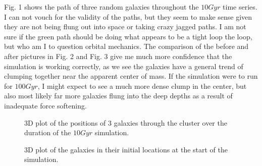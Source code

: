 \documentclass[twocolumn,11pt]{article}
\begin{document}
Fig. 1 shows the path of three random galaxies throughout the $10Gyr$ time series. I can not vouch for the validity of the paths, but they seem to make sense given they are not being flung out into space or taking crazy jagged paths. I am not sure if the green path should be doing what appears to be a tight loop the loop, but who am I to question orbital mechanics. The comparison of the before and after pictures in Fig. 2 and Fig. 3 give me much more confidence that the simulation is working correctly, as we see the galaxies have a general trend of clumping together near the apparent center of mass. If the simulation were to run for $100Gyr$, I might expect to see a much more dense clump in the center, but also most likely far more galaxies flung into the deep depths as a result of inadequate force softening.

\begin{figure}[!h]
	\centering
	\noindent
      \caption{3D plot of the positions of 3 galaxies through the cluster over the duration of the $10Gyr$ simulation.}
\end{figure}

\begin{figure}[!h]
	\centering
	\noindent
      \caption{3D plot of the galaxies in their initial locations at the start of the simulation.}
\end{figure}
\end{document}
